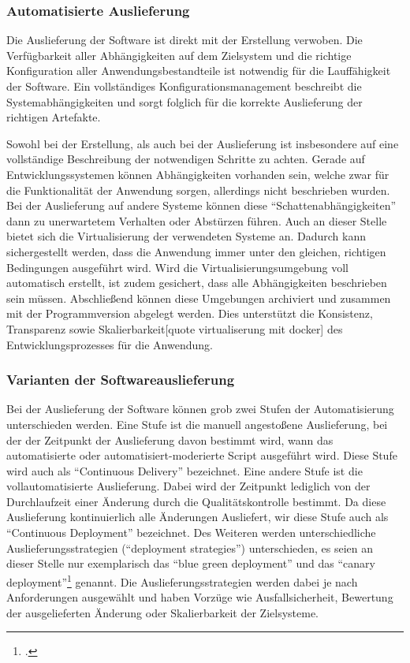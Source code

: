 \subsubsection{Automatisierte Auslieferung}

Die Auslieferung der Software ist direkt mit der Erstellung verwoben. Die Verfügbarkeit aller Abhängigkeiten auf dem 
Zielsystem und die richtige Konfiguration aller Anwendungsbestandteile ist notwendig für die Lauffähigkeit der Software. 
Ein vollständiges Konfigurationsmanagement beschreibt die Systemabhängigkeiten und sorgt folglich für die korrekte 
Auslieferung der richtigen Artefakte.

Sowohl bei der Erstellung, als auch bei der Auslieferung ist insbesondere auf eine vollständige Beschreibung der 
notwendigen Schritte zu achten. Gerade auf Entwicklungssystemen können Abhängigkeiten vorhanden sein, welche zwar für die 
Funktionalität der Anwendung sorgen, allerdings nicht beschrieben wurden. Bei der Auslieferung auf andere Systeme können 
diese ``Schattenabhängigkeiten'' dann zu unerwartetem Verhalten oder Abstürzen führen. 
Auch an dieser Stelle bietet sich die Virtualisierung der verwendeten Systeme an. Dadurch kann sichergestellt werden, 
dass die Anwendung immer unter den gleichen, richtigen Bedingungen ausgeführt wird. Wird die Virtualisierungsumgebung 
voll automatisch erstellt, ist zudem gesichert, dass alle Abhängigkeiten beschrieben sein müssen.
Abschließend können diese Umgebungen archiviert und zusammen mit der Programmversion abgelegt werden. Dies unterstützt 
die Konsistenz, Transparenz sowie Skalierbarkeit[quote virtualiserung mit docker] des Entwicklungsprozesses für die 
Anwendung.

\subsubsection{Varianten der Softwareauslieferung}

Bei der Auslieferung der Software können grob zwei Stufen der Automatisierung unterschieden werden. Eine Stufe ist die 
manuell angestoßene Auslieferung, bei der der Zeitpunkt der Auslieferung davon bestimmt wird, wann das automatisierte 
oder automatisiert-moderierte Script ausgeführt wird. Diese Stufe wird auch als ``Continuous Delivery'' bezeichnet. Eine andere Stufe ist die vollautomatisierte Auslieferung. Dabei wird der 
Zeitpunkt lediglich von der Durchlaufzeit einer Änderung durch die Qualitätskontrolle bestimmt. Da diese Auslieferung kontinuierlich alle Änderungen Ausliefert, wir diese Stufe auch als ``Continuous Deployment'' bezeichnet.
Des Weiteren werden unterschiedliche Auslieferungsstrategien (``deployment strategies'') unterschieden, es seien an 
dieser Stelle nur exemplarisch das ``blue green deployment'' und das ``canary deployment''\footcite[261-264 Deploying and Releasing Applications][]
{humble2010} genannt. Die Auslieferungsstrategien werden dabei je nach Anforderungen ausgewählt und haben Vorzüge wie 
Ausfallsicherheit, Bewertung der ausgelieferten Änderung oder Skalierbarkeit der Zielsysteme.

